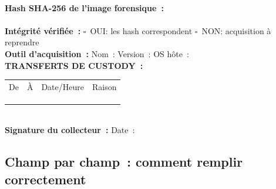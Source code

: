 \begin{boxcustody}
\texttt{\underline{\hspace{10cm}}}\\[0.3ex]
\textbf{Hash SHA-256 de l'image forensique~:}\\
\texttt{\underline{\hspace{10cm}}}\\[0.5ex]
\textbf{Intégrité vérifiée~:}
$\square$~OUI: les hash correspondent
\quad $\square$~NON: acquisition à reprendre\\[0.5ex]
\textbf{Outil d'acquisition~:} Nom~: \underline{\hspace{3cm}}
Version~: \underline{\hspace{2cm}}
OS hôte~: \underline{\hspace{2.5cm}}\\[0.8ex]
\textbf{TRANSFERTS DE CUSTODY~:}\\[0.3ex]
\begin{tabular}{p{2.8cm}p{2.8cm}p{2.0cm}p{3.5cm}}
De & À & Date/Heure & Raison \\
\underline{\hspace{2.6cm}} & \underline{\hspace{2.6cm}} &
\underline{\hspace{1.8cm}} & \underline{\hspace{3.3cm}} \\[0.4ex]
\underline{\hspace{2.6cm}} & \underline{\hspace{2.6cm}} &
\underline{\hspace{1.8cm}} & \underline{\hspace{3.3cm}} \\[0.4ex]
\underline{\hspace{2.6cm}} & \underline{\hspace{2.6cm}} &
\underline{\hspace{1.8cm}} & \underline{\hspace{3.3cm}} \\
\end{tabular}
\\[0.8ex]
\textbf{Signature du collecteur~:} \underline{\hspace{5cm}}
\quad Date~: \underline{\hspace{2.5cm}}
\end{boxcustody}

\subsection{Champ par champ~: comment remplir correctement}

